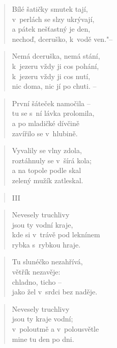 \begin{verse}
Bílé šatičky smutek tají, \\
v~perlách se slzy ukrývají, \\
a pátek nešťastný je den, \\
nechoď, dceruško, k~vodě ven."--
\end{verse}

\begin{verse}
Nemá dceruška, nemá stání, \\
k~jezeru vždy ji cos pohání, \\
k~jezeru vždy ji cos nutí, \\
nic doma, nic jí po chuti. --
\end{verse}

\begin{verse}
První šáteček namočila -- \\
tu se s~ní lávka prolomila, \\
a po mladičké dívčině \\
zavířilo se v~hlubině.
\end{verse}

\begin{verse}
Vyvalily se vlny zdola, \\
roztáhnuly se v~šírá kola; \\
a na topole podle skal \\
zelený mužík zatleskal.
\end{verse}

\begin{verse}
III
\end{verse}

\begin{verse}
Nevesely truchlivy \\
jsou ty vodní kraje, \\
kde si v~trávě pod leknínem \\
rybka s~rybkou hraje.
\end{verse}

\begin{verse}
Tu slunéčko nezahřívá, \\
větřík nezavěje: \\
chladno, ticho -- \\
jako žel v~srdci bez naděje.
\end{verse}

\begin{verse}
Nevesely truchlivy \\
jsou ty kraje vodní; \\
v~poloutmě a v~polousvětle \\
mine tu den po dni.
\end{verse}

